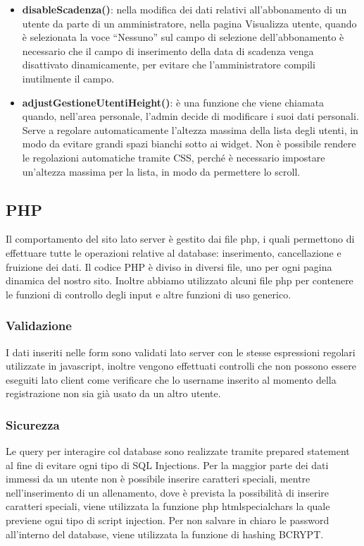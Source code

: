 \documentclass[a4paper]{article}
\begin{document}
\begin{itemize}
		\item \textbf{disableScadenza()}: nella modifica dei dati relativi all'abbonamento di un utente da parte di un amministratore, nella pagina Visualizza utente, quando è selezionata la voce “Nessuno” sul campo di selezione dell'abbonamento è necessario che il campo di inserimento della data di scadenza venga disattivato dinamicamente, per evitare che l'amministratore compili inutilmente il campo.
		\item \textbf{adjustGestioneUtentiHeight()}: è una funzione che viene chiamata quando, nell'area personale, l'admin decide di modificare i suoi dati personali. Serve a regolare automaticamente l'altezza massima della lista degli utenti, in modo da evitare grandi spazi bianchi sotto ai widget. Non è possibile rendere le regolazioni automatiche tramite CSS, perché è necessario impostare un'altezza massima per la lista, in modo da permettere lo scroll.
	\end{itemize}
	
	\subsection{PHP}
	Il comportamento del sito lato server è gestito dai file php, i quali permettono di effettuare tutte le operazioni relative al database: inserimento, cancellazione e fruizione dei dati. Il codice PHP è diviso in diversi file, uno per ogni pagina dinamica del nostro sito. Inoltre abbiamo utilizzato alcuni file php per contenere le funzioni di controllo degli input e altre funzioni di uso generico.
	\subsubsection{Validazione}
	I dati inseriti nelle form sono validati lato server con le stesse espressioni regolari utilizzate in javascript, inoltre vengono effettuati controlli che non possono essere eseguiti lato client come verificare che lo username inserito al momento della registrazione non sia già usato da un altro utente.
	\subsubsection{Sicurezza}
	Le query per interagire col database sono realizzate tramite prepared statement al fine di evitare ogni tipo di SQL Injections. Per la maggior parte dei dati immessi da un utente non è possibile inserire caratteri speciali, mentre nell'inserimento di un allenamento, dove è prevista la possibilità di inserire caratteri speciali, viene utilizzata la funzione php htmlspecialchars la quale previene ogni tipo di script injection. Per non salvare in chiaro le password all'interno del database, viene utilizzata la funzione di hashing BCRYPT.
\end{document}

